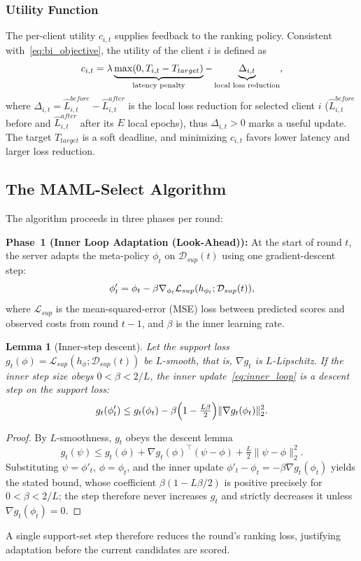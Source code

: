 \documentclass[journal]{IEEEtran}
\newtheorem{Lemma}{Lemma}
\newcommand{\revision}[1]{#1}
\begin{document}
\subsubsection{Utility Function}
\revision{The per-client utility $c_{i,t}$ supplies feedback to the ranking policy. Consistent with~\eqref{eq:bi_objective}, the utility of the client $i$ is defined as}
\begin{equation}
	\color{black}
	c_{i,t} = \lambda \underbrace{\max(0, T_{i,t} - T_{target})}_{\text{latency penalty}} - \underbrace{\Delta_{i,t}}_{\text{local loss reduction}},
	\label{eq:cost}
\end{equation}
\revision{where $\Delta_{i,t}=\hat{L}_{i,t}^{before}-\hat{L}_{i,t}^{after}$ is the local loss reduction for selected client $i$ ($\hat{L}_{i,t}^{before}$ before and $\hat{L}_{i,t}^{after}$ after its $E$ local epochs), thus $\Delta_{i,t}>0$ marks a useful update. %
The target $T_{target}$ is a soft deadline, and minimizing $c_{i,t}$ favors lower latency and larger loss reduction.}

\subsection{The MAML-Select Algorithm}
The algorithm proceeds in three phases per round:

\textbf{Phase~1 (Inner Loop Adaptation (Look-Ahead)):}
At the start of round $t$, \revision{the server adapts the meta-policy $\phi_t$ on $\mathcal{D}_{sup}(t)$ using one gradient-descent step:}
\begin{equation}
	\color{black}
		\phi'_t = \phi_t - \beta \nabla_{\phi_t} \mathcal{L}_{sup}(h_{\phi_t};\mathcal{D}_{sup}(t)),
		\label{eq:inner_loop}
\end{equation}
where $\mathcal{L}_{sup}$ is the mean-squared-error (MSE) loss between predicted scores and observed costs from round $t-1$, and $\beta$ is the inner learning rate.

{\color{black}
\begin{Lemma}[Inner-step descent]\label{stmt:inner}
Let the support loss $g_t(\phi)=\mathcal{L}_{sup}(h_\phi;\mathcal{D}_{sup}(t))$ be $L$-smooth, that is, $\nabla g_t$ is $L$-Lipschitz. If the inner step size obeys $0<\beta<2/L$, the inner update~\eqref{eq:inner_loop} is a descent step on the support loss:
\[
g_t(\phi'_t)\le g_t(\phi_t)-\beta\Bigl(1-\tfrac{L\beta}{2}\Bigr)\lVert\nabla g_t(\phi_t)\rVert_2^2 .
\]
\end{Lemma}
\begin{proof}
By $L$-smoothness, $g_t$ obeys the descent lemma
\[
g_t(\psi)\le g_t(\phi)+\nabla g_t(\phi)^{\top}(\psi-\phi)+\tfrac{L}{2}\lVert\psi-\phi\rVert_2^2 .
\]
Substituting $\psi=\phi'_t$, $\phi=\phi_t$, and the inner update $\phi'_t-\phi_t=-\beta\nabla g_t(\phi_t)$ yields the stated bound, whose coefficient $\beta(1-L\beta/2)$ is positive precisely for $0<\beta<2/L$; the step therefore never increases $g_t$ and strictly decreases it unless $\nabla g_t(\phi_t)=0$.
\end{proof}
A single support-set step therefore reduces the round's ranking loss, justifying adaptation before the current candidates are scored.
}
\end{document}
